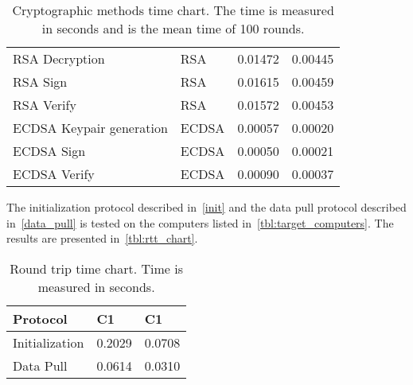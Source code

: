 \begin{table}[h]
\begin{tabular}{llll}
  RSA Decryption                              & RSA             & 0.01472              & 0.00445              \\ %
  RSA Sign                                    & RSA             & 0.01615              & 0.00459              \\ %
  RSA Verify                                  & RSA             & 0.01572              & 0.00453              \\ %
  ECDSA Keypair generation                    & ECDSA           & 0.00057              & 0.00020              \\ %
  ECDSA Sign                                  & ECDSA           & 0.00050              & 0.00021              \\ %
  ECDSA Verify                                & ECDSA           & 0.00090              & 0.00037              \\ %
  \end{tabular}
  \caption{Cryptographic methods time chart. The time is measured in seconds and is the mean time of 100 rounds. }
  \label{tbl:time_chart}
\end{table}


The initialization protocol described in~\autoref{init} and the data pull protocol described in~\autoref{data_pull} is tested on the computers listed in~\autoref{tbl:target_computers}.
The results are presented in~\autoref{tbl:rtt_chart}.
\begin{table}[h]
  \begin{tabular}{lll}
  Protocol                                & C1                    & C1                      \\ \hline
  Initialization                          & 0.2029                & 0.0708                  \\ %
  Data Pull                               & 0.0614                & 0.0310                  \\ %
  \end{tabular}
  \caption{Round trip time chart. Time is measured in seconds.}
  \label{tbl:rtt_chart}
\end{table}

